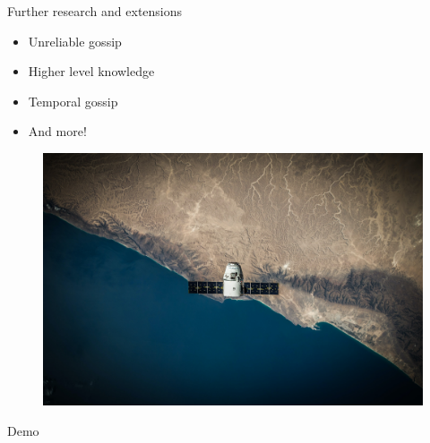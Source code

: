 \documentclass[aspectratio=169]{beamer}
\begin{document}
\begin{frame}[c]{Further research and extensions}
    \begin{multicols}{2}
        \begin{itemize}
            \item<1-> Unreliable gossip \cite{martins_dealing_2020}
            \item<2-> Higher level knowledge \cite{herzig_how_2017}
            \item<3-> Temporal gossip \cite{slavkovik_temporal_2019}
            \item<4-> And more!
        \end{itemize}
        \columnbreak
        \begin{figure}
            \centering
            \includegraphics[width=\linewidth]{sattelite.jpg}
        \end{figure}
    \end{multicols}
\end{frame}
\begin{frame}[t]
    \Huge
    \vfill
    \vfill
    \begin{center}
        Demo
    \end{center}
    \vfill
\end{frame}
\end{document}
